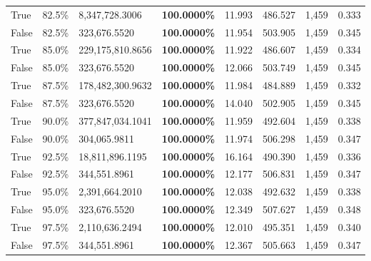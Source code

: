 \begin{table}[H]
\begin{tabular}{lllrllll}
\cline{1-8}
True & 82.5\% & 8,347,728.3006 & \bfseries \color{red} 100.0000\% & 11.993 & 486.527 & 1,459 & 0.333 \\
\cline{1-8}
False & 82.5\% & 323,676.5520 & \bfseries \color{red} 100.0000\% & 11.954 & 503.905 & 1,459 & 0.345 \\
\cline{1-8}
True & 85.0\% & 229,175,810.8656 & \bfseries \color{red} 100.0000\% & 11.922 & 486.607 & 1,459 & 0.334 \\
\cline{1-8}
False & 85.0\% & 323,676.5520 & \bfseries \color{red} 100.0000\% & 12.066 & 503.749 & 1,459 & 0.345 \\
\cline{1-8}
True & 87.5\% & 178,482,300.9632 & \bfseries \color{red} 100.0000\% & 11.984 & 484.889 & 1,459 & 0.332 \\
\cline{1-8}
False & 87.5\% & 323,676.5520 & \bfseries \color{red} 100.0000\% & 14.040 & 502.905 & 1,459 & 0.345 \\
\cline{1-8}
True & 90.0\% & 377,847,034.1041 & \bfseries \color{red} 100.0000\% & 11.959 & 492.604 & 1,459 & 0.338 \\
\cline{1-8}
False & 90.0\% & \color{red} 304,065.9811 & \bfseries \color{red} 100.0000\% & 11.974 & 506.298 & 1,459 & 0.347 \\
\cline{1-8}
True & 92.5\% & 18,811,896.1195 & \bfseries \color{red} 100.0000\% & 16.164 & 490.390 & 1,459 & 0.336 \\
\cline{1-8}
False & 92.5\% & 344,551.8961 & \bfseries \color{red} 100.0000\% & 12.177 & 506.831 & 1,459 & 0.347 \\
\cline{1-8}
True & 95.0\% & 2,391,664.2010 & \bfseries \color{red} 100.0000\% & 12.038 & 492.632 & 1,459 & 0.338 \\
\cline{1-8}
False & 95.0\% & 323,676.5520 & \bfseries \color{red} 100.0000\% & 12.349 & 507.627 & 1,459 & 0.348 \\
\cline{1-8}
True & 97.5\% & 2,110,636.2494 & \bfseries \color{red} 100.0000\% & 12.010 & 495.351 & 1,459 & 0.340 \\
\cline{1-8}
False & 97.5\% & 344,551.8961 & \bfseries \color{red} 100.0000\% & 12.367 & 505.663 & 1,459 & 0.347 \\
\cline{1-8}
\bottomrule
\end{tabular}
\end{table}
